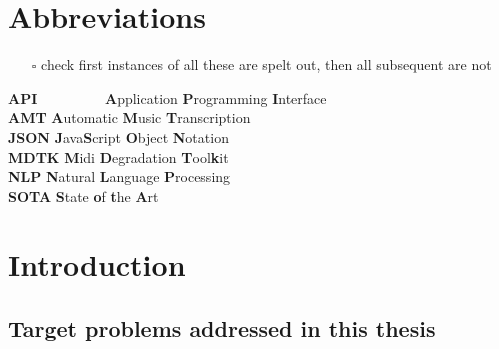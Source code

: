\documentclass[12pt,a4paper,]{report}
\providecommand{\tightlist}{%
  \setlength{\itemsep}{0pt}\setlength{\parskip}{0pt}}
\begin{document}
\newpage


\tableofcontents

\newpage
\listoffigures

\newpage

\listoftables

\newpage

\hypertarget{abbreviations}{%
\chapter*{Abbreviations}\label{abbreviations}}

\begin{itemize}
\tightlist
\item[$\square$]
  check first instances of all these are spelt out, then all subsequent
  are not
\end{itemize}

\begin{tabbing}
\textbf{API}~~~~~~~~~ \= \textbf{A}pplication \textbf{P}rogramming \textbf{I}nterface \\
\textbf{AMT} \> \textbf{A}utomatic \textbf{M}usic \textbf{T}ranscription \\
\textbf{JSON} \> \textbf{J}ava\textbf{S}cript \textbf{O}bject \textbf{N}otation \\
\textbf{MDTK} \> \textbf{M}idi \textbf{D}egradation \textbf{T}ool\textbf{k}it \\
\textbf{NLP} \> \textbf{N}atural \textbf{L}anguage \textbf{P}rocessing \\
\textbf{SOTA} \> \textbf{S}tate \textbf{o}f \textbf{t}he \textbf{A}rt \\
\end{tabbing}

\newpage


\hypertarget{introduction}{%
\chapter{Introduction}\label{introduction}}

\hypertarget{target-problems-addressed-in-this-thesis}{%
\section{Target problems addressed in this
thesis}\label{target-problems-addressed-in-this-thesis}}
\end{document}
